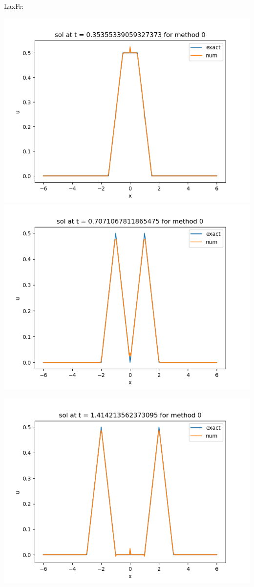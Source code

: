 \documentclass{article}
\begin{document}
\begin{enumerate}
\begin{enumerate}
	LaxFr:
	\begin{center}
		\includegraphics[scale=.32]{hw11 sol n = 10 method 0}
		\includegraphics[scale=.32]{hw11 sol n = 20 method 0}
	\end{center}
	\begin{center}
		\includegraphics[scale=.32]{hw11 sol n = 40 method 0}

\end{center}
\end{enumerate}
\end{enumerate}
\end{document}
